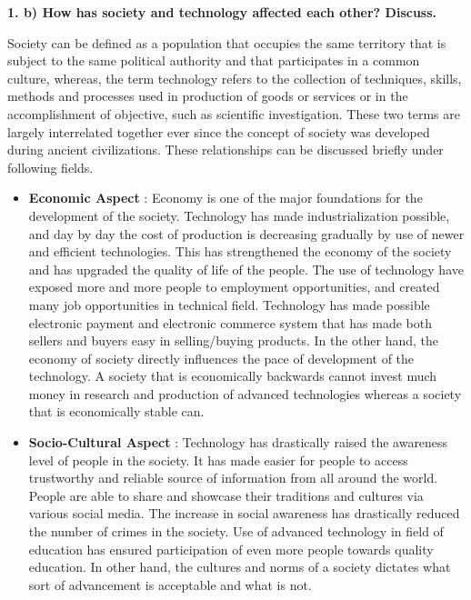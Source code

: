 \documentclass [12pt, a4paper]{article}
\begin{document}
\large \textbf{1. b) How has society and technology affected each other? Discuss.}

\normalsize
Society can be defined as a population that occupies the same territory that is subject to the same political authority and that participates in a common culture, whereas, the term technology refers to the collection of techniques, skills, methods and processes used in production of goods or services or in the accomplishment of objective, such as scientific investigation. These two terms are largely interrelated together ever since the concept of society was developed during ancient civilizations. These relationships can be discussed briefly under following fields.

\begin{itemize}
\item \textbf{Economic Aspect} : Economy is one of the major foundations for the development of the society. Technology has made industrialization possible, and day by day the cost of production is decreasing gradually by use of newer and efficient technologies. This has strengthened the economy of the society and has upgraded the quality of life of the people. The use of technology have exposed more and more people to employment opportunities, and created many job opportunities in technical field. Technology has made possible electronic payment and electronic commerce system that has made both sellers and buyers easy in selling/buying products. In the other hand, the economy of society directly influences the pace of development of the technology. A society that is economically backwards cannot invest much money in research and production of advanced technologies whereas a society that is economically stable can.

\item \textbf{Socio-Cultural Aspect}  : Technology has drastically raised the awareness level of people in the society. It has made easier for people to access trustworthy and reliable source of information from all around the world. People are able to share and showcase their traditions and cultures via various social media. The increase in social awareness has drastically reduced the number of crimes in the society. Use of advanced technology in field of education has ensured participation of even more people towards quality education. In other hand, the cultures and norms of a society dictates what sort of advancement is acceptable and what is not.



\end{itemize}
\end{document}
